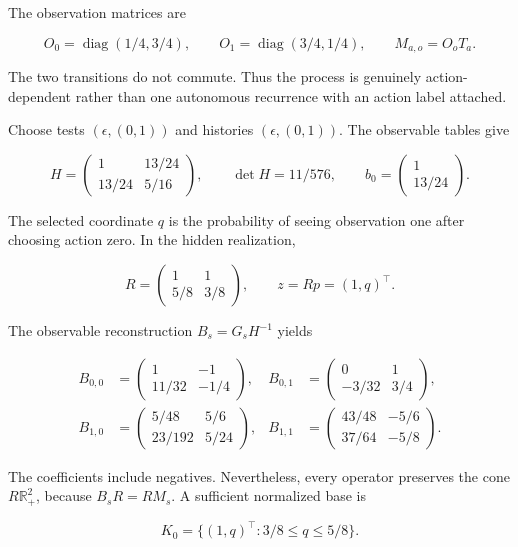 The observation matrices are

\[
O_0=\operatorname{diag}(1/4,3/4),\qquad
O_1=\operatorname{diag}(3/4,1/4),\qquad
M_{a,o}=O_oT_a.
\]

The two transitions do not commute. Thus the process is genuinely
action-dependent rather than one autonomous recurrence with an action
label attached.

Choose tests \((\epsilon,(0,1))\) and histories \((\epsilon,(0,1))\).
The observable tables give

\[
H=\begin{pmatrix}1&13/24\\13/24&5/16\end{pmatrix},\qquad
\det H=11/576,\qquad
b_0=\begin{pmatrix}1\\13/24\end{pmatrix}.
\]

The selected coordinate \(q\) is the probability of seeing observation
one after choosing action zero. In the hidden realization,

\[
R=\begin{pmatrix}1&1\\5/8&3/8\end{pmatrix},\qquad
z=Rp=(1,q)^\top.
\]

The observable reconstruction \(B_s=G_sH^{-1}\) yields

\[
\begin{aligned}
B_{0,0}&=\begin{pmatrix}1&-1\\11/32&-1/4\end{pmatrix},&
B_{0,1}&=\begin{pmatrix}0&1\\-3/32&3/4\end{pmatrix},\\[4pt]
B_{1,0}&=\begin{pmatrix}5/48&5/6\\23/192&5/24\end{pmatrix},&
B_{1,1}&=\begin{pmatrix}43/48&-5/6\\37/64&-5/8\end{pmatrix}.
\end{aligned}
\]

The coefficients include negatives. Nevertheless, every operator
preserves the cone \(R\mathbb R^2_+\), because \(B_sR=RM_s\). A
sufficient normalized base is

\[
K_0=\{(1,q)^\top:3/8\leq q\leq5/8\}.
\]

